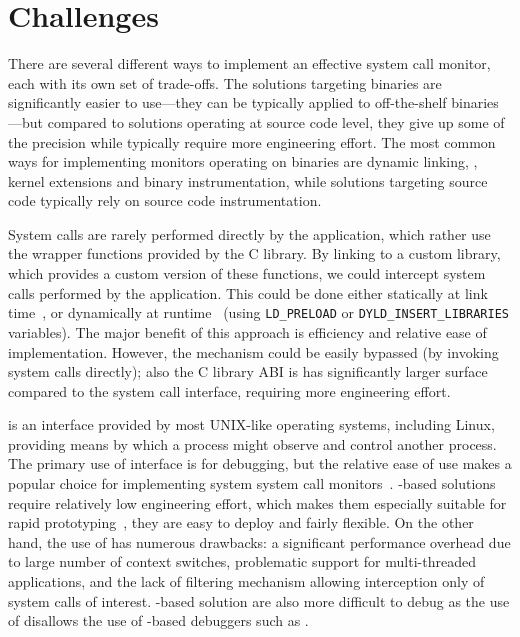 \section{Challenges}

There are several different ways to implement an effective system call monitor,
each with its own set of trade-offs. The solutions targeting binaries are
significantly easier to use---they can be typically applied to off-the-shelf
binaries---but compared to solutions operating at source code level, they give
up some of the precision while typically require more engineering effort. The
most common ways for implementing monitors operating on binaries are dynamic
linking, \ptrace, kernel extensions and binary instrumentation, while solutions
targeting source code typically rely on source code instrumentation.

System calls are rarely performed directly by the application, which rather use
the wrapper functions provided by the C library. By linking to a custom
library, which provides a custom version of these functions, we could intercept
system calls performed by the application. This could be done either statically
at link time~\cite{plash}, or dynamically at runtime~\cite{shepherding:pldi14}
(\eg using \lstinline`LD_PRELOAD` or \lstinline`DYLD_INSERT_LIBRARIES`
variables). The major benefit of this approach is efficiency and relative ease
of implementation. However, the mechanism could be easily bypassed (\eg by
invoking system calls directly); also the C library ABI is has significantly
larger surface compared to the system call interface, requiring more
engineering effort.

\ptrace is an interface provided by most UNIX-like operating systems, including
Linux, providing means by which a process might observe and control another
process. The primary use of \ptrace interface is for debugging, but the
relative ease of use makes \ptrace a popular choice for implementing system
system call monitors~\cite{wily-hacker,orchestra09,tachyon12}. \ptrace-based
solutions require relatively low engineering effort, which makes them
especially suitable for rapid prototyping~\cite{spillane07}, they are easy to
deploy and fairly flexible. On the other hand, the use of \ptrace has numerous
drawbacks: a significant performance overhead due to large number of context
switches, problematic support for multi-threaded applications, and the lack of
filtering mechanism allowing interception only of system calls of interest.
\ptrace-based solution are also more difficult to debug as the use of \ptrace
disallows the use of \ptrace-based debuggers such as \gdb.

